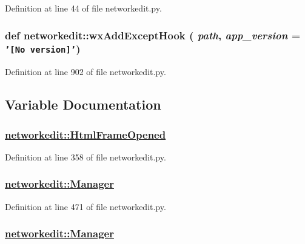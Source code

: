 Definition at line 44 of file networkedit.py.\hypertarget{namespacenetworkedit_5c3ac4301719e50188f9d6fbfe9d140d}{
\subsubsection[wxAddExceptHook]{\setlength{\rightskip}{0pt plus 5cm}def networkedit::wx\-Add\-Except\-Hook ( {\em path},  {\em app\_\-version} = {\tt '\mbox{[}No~version\mbox{]}'})}}
\label{namespacenetworkedit_5c3ac4301719e50188f9d6fbfe9d140d}




Definition at line 902 of file networkedit.py.

\subsection{Variable Documentation}
\hypertarget{namespacenetworkedit_ddee62320ad1538935c4fb221114ad6c}{
\subsubsection[HtmlFrameOpened]{\setlength{\rightskip}{0pt plus 5cm}\hyperlink{namespacenetworkedit_ddee62320ad1538935c4fb221114ad6c}{networkedit::Html\-Frame\-Opened}}}
\label{namespacenetworkedit_ddee62320ad1538935c4fb221114ad6c}




Definition at line 358 of file networkedit.py.\hypertarget{namespacenetworkedit_cf4848f1a2b858ef442d2bcb3a348af1}{
\subsubsection[Manager]{\setlength{\rightskip}{0pt plus 5cm}\hyperlink{namespacenetworkedit_cf4848f1a2b858ef442d2bcb3a348af1}{networkedit::Manager}}}
\label{namespacenetworkedit_cf4848f1a2b858ef442d2bcb3a348af1}




Definition at line 471 of file networkedit.py.\hypertarget{namespacenetworkedit_cf4848f1a2b858ef442d2bcb3a348af1}{
\subsubsection[Manager]{\setlength{\rightskip}{0pt plus 5cm}\hyperlink{namespacenetworkedit_cf4848f1a2b858ef442d2bcb3a348af1}{networkedit::Manager}}}
\label{namespacenetworkedit_cf4848f1a2b858ef442d2bcb3a348af1}




